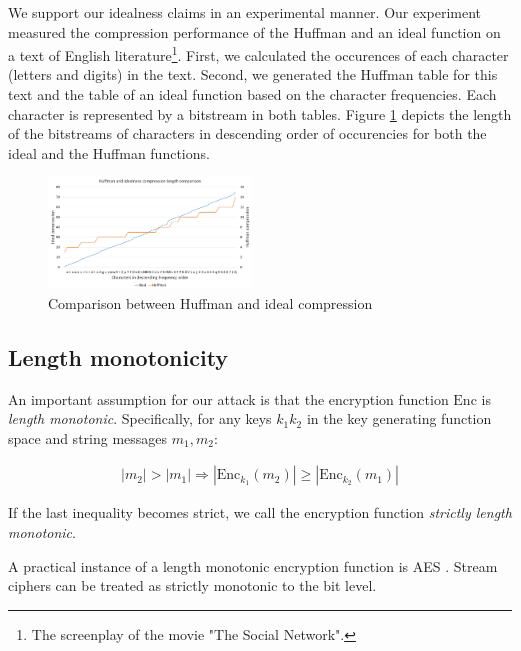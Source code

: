 \documentclass[conference, letterpaper, 10pt]{IEEEtran}
\begin{document}
We support our idealness claims in an experimental manner. Our experiment
measured the compression performance of the Huffman and an ideal function on a
text of English literature\footnote{The screenplay of the movie "The Social
Network".}. First, we calculated the occurences of each character (letters and
digits) in the text. Second, we generated the Huffman
table for this text and the table of an ideal function based on the character
frequencies. Each character is represented by a bitstream in both tables. Figure
\ref{fig:huffman_idealness} depicts the length of the bitstreams of characters
in descending order of occurencies for both the ideal and the Huffman functions.

    \begin{figure}[thpb]
        \centering
            \includegraphics[width=0.48\textwidth]{idealness_experiments/huffman_idealness.png}
        \caption{Comparison between Huffman and ideal compression}
        \label{fig:huffman_idealness}
    \end{figure}

\subsection{Length monotonicity}\label{subsec:lenmonotone}

An important assumption for our attack is that the encryption function
$\textrm{Enc}$ is \textit{length monotonic}. Specifically, for any keys $k_1
k_2$ in the key generating function space and string messages $m_1, m_2$:

\begin{equation*}
\begin{split}
|m_2| > |m_1|
\Rightarrow
|\textrm{Enc}_{k_1}(m_2)| \geq |\textrm{Enc}_{k_2}(m_1)|
\end{split}
\end{equation*}

If the last inequality becomes strict, we call the encryption function
\textit{strictly length monotonic}.

A practical instance of a length monotonic encryption function is AES \cite{c9}.
Stream ciphers can be treated as strictly monotonic to the bit level.
\end{document}

